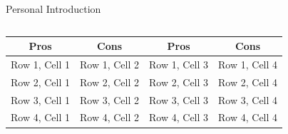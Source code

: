 \documentclass{beamer}
\begin{document}

\begin{frame}[t]{Personal Introduction}

  \begin{columns}[c]
    \begin{column}{0.5\textwidth}
    \end{column}
    \begin{column}{0.5\textwidth}
    \end{column}
  \end{columns}
\end{frame}
\begin{frame}
  \begin{center}
    \begin{tabular}{c|c|c|c}
      \textbf{Pros} & \textbf{Cons} & \textbf{Pros} & \textbf{Cons} \\
      \hline
      Row 1, Cell 1 & Row 1, Cell 2 & Row 1, Cell 3 & Row 1, Cell 4 \\
      \hline
      Row 2, Cell 1 & Row 2, Cell 2 & Row 2, Cell 3 & Row 2, Cell 4 \\
      \hline
      Row 3, Cell 1 & Row 3, Cell 2 & Row 3, Cell 3 & Row 3, Cell 4 \\
      \hline
      Row 4, Cell 1 & Row 4, Cell 2 & Row 4, Cell 3 & Row 4, Cell 4 
    \end{tabular}
  \end{center}
\end{frame}
\end{document}
